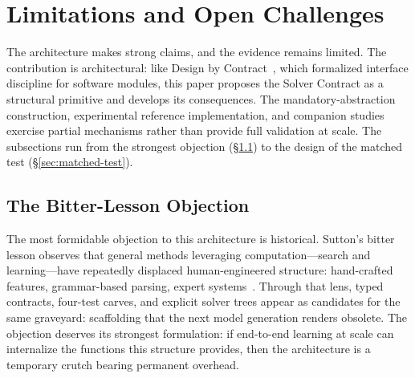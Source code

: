 \documentclass[11pt]{article}
\begin{document}
\section{Limitations and Open Challenges}
\label{sec:limitations}

The architecture makes strong claims, and the evidence remains limited. The contribution is architectural: like Design by Contract~\cite{meyer1992dbc}, which formalized interface discipline for software modules, this paper proposes the Solver Contract as a structural primitive and develops its consequences. The mandatory-abstraction construction, experimental reference implementation, and companion studies~\cite{westerberg2026fiprotocol,westerberg2026ontology,westerberg2026sema} exercise partial mechanisms rather than provide full validation at scale. The subsections run from the strongest objection (\S\ref{sec:bitter-lesson}) to the design of the matched test (\S\ref{sec:matched-test}).

\subsection{The Bitter-Lesson Objection}
\label{sec:bitter-lesson}

The most formidable objection to this architecture is historical.
Sutton's bitter lesson observes that general methods leveraging
computation---search and learning---have repeatedly displaced
human-engineered structure: hand-crafted features, grammar-based parsing,
expert systems~\cite{sutton2019bitter}. Through that lens, typed
contracts, four-test carves, and explicit solver trees appear as
candidates for the same graveyard: scaffolding that the next model
generation renders obsolete. The objection deserves its strongest
formulation: if end-to-end learning at scale can internalize the
functions this structure provides, then the architecture is a temporary
crutch bearing permanent overhead.
\end{document}
